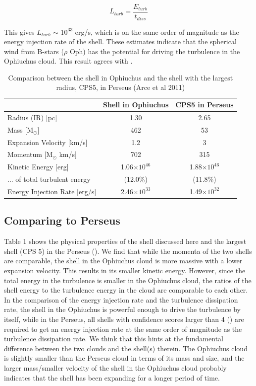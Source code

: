 \documentclass[11pt,a4paper]{emulateapj}
\begin{document}
\begin{equation}
L_{turb} = \frac{E_{turb}}{t_{diss}}
\end{equation}

This gives $L_{turb}$ $\sim$ $10^{33}$ erg/s, which is on the same order of magnitude as the energy injection rate of the shell. These estimates indicate that the spherical wind from B-stars ($\rho$ Oph) has the potential for driving the turbulence in the Ophiuchus cloud. This result agrees with \citet{Arce_2011}.

\begin{table}
\centering
\begin{tabular}{lcc}
\hline
& \textbf{Shell in Ophiuchus} & \textbf{CPS5 in Perseus} \\   
\hline
Radius (IR) [pc] & 1.30 & 2.65 \\ 
Mass [M$_{\odot}$] & 462 & 53 \\ 
Expansion Velocity [km/s] & 1.2 & 3 \\ 
Momentum [M$_{\odot}$ km/s]& 702 & 315 \\ 
Kinetic Energy [erg]& 1.06$\times10^{46}$ & 1.88$\times10^{46}$ \\ 
... of total turbulent energy & (12.0\%) & (11.8\%) \\ 
Energy Injection Rate [erg/s] & 2.46$\times10^{33}$ & 1.49$\times10^{32}$ \\
\hline
\end{tabular}
\caption{Comparison between the shell in Ophiuchus and the shell with the largest radius, CPS5, in Perseus (Arce et al 2011)}
\end{table}

\subsection{Comparing to Perseus}
Table 1 shows the physical properties of the shell discussed here and the largest shell (CPS 5) in the Perseus (\citet{Arce_2011}). We find that while the momenta of the two shells are comparable, the shell in the Ophiuchus cloud is more massive with a lower expansion velocity. This results in its smaller kinetic energy. However, since the total energy in the turbulence is smaller in the Ophiuchus cloud, the ratios of the shell energy to the turbulence energy in the cloud are comparable to each other. In the comparison of the energy injection rate and the turbulence dissipation rate, the shell in the Ophiuchus is powerful enough to drive the turbulence by itself, while in the Perseus, all shells with confidence scores larger than 4 (\citet{Arce_2011}) are required to get an energy injection rate at the same order of magnitude as the turbulence dissipation rate. We think that this hints at the fundamental difference between the two clouds and the shell(s) therein. The Ophiuchus cloud is slightly smaller than the Perseus cloud in terms of its mass and size, and the larger mass/smaller velocity of the shell in the Ophiuchus cloud probably indicates that the shell has been expanding for a longer period of time.
\end{document}
